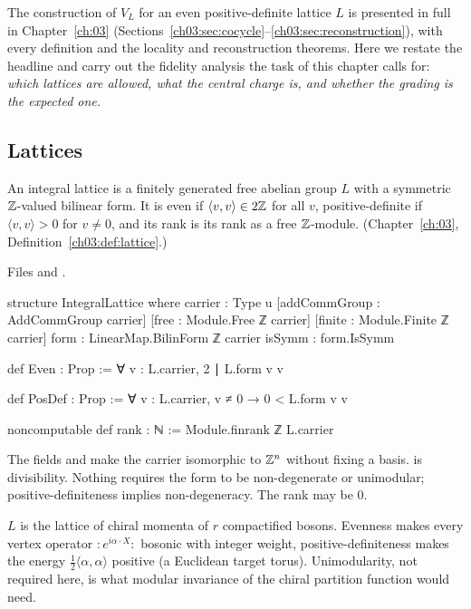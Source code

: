 The construction of $V_L$ for an even positive-definite lattice $L$ is presented in full in
Chapter~\ref{ch:03} (Sections~\ref{ch03:sec:cocycle}--\ref{ch03:sec:reconstruction}), with every
definition and the locality and reconstruction theorems. Here we restate the headline and carry out the
fidelity analysis the task of this chapter calls for: \emph{which lattices are allowed, what the central
charge is, and whether the grading is the expected one.}

\subsection{Lattices}

\begin{definition}\label{l05:def:lattice}
An integral lattice is a finitely generated free abelian group $L$ with a symmetric ${\mathbb{Z}}$-valued bilinear form.
It is even if $\langle v,v\rangle\in2{\mathbb{Z}}$ for all $v$, positive-definite if $\langle v,v\rangle>0$ for $v\ne0$, and
its rank is its rank as a free ${\mathbb{Z}}$-module. (Chapter~\ref{ch:03}, Definition~\ref{ch03:def:lattice}.)
\end{definition}

\noindent Files  and .
\begin{leancode}
structure IntegralLattice where
  carrier : Type u
  [addCommGroup : AddCommGroup carrier]
  [free : Module.Free ℤ carrier]
  [finite : Module.Finite ℤ carrier]
  form : LinearMap.BilinForm ℤ carrier
  isSymm : form.IsSymm

def Even : Prop := ∀ v : L.carrier, 2 ∣ L.form v v

def PosDef : Prop := ∀ v : L.carrier, v ≠ 0 → 0 < L.form v v

noncomputable def rank : ℕ := Module.finrank ℤ L.carrier
\end{leancode}

\begin{dictionary}
The fields  and  make the carrier isomorphic to ${\mathbb{Z}}^n$ without fixing a basis.
 is divisibility. Nothing requires the form to be non-degenerate or unimodular; positive-definiteness
implies non-degeneracy. The rank may be $0$.
\end{dictionary}

\begin{physics}
$L$ is the lattice of chiral momenta of $r$ compactified bosons. Evenness makes every vertex operator
${:}e^{i\alpha\cdot X}{:}$ bosonic with integer weight, positive-definiteness makes the energy
$\frac12\langle\alpha,\alpha\rangle$ positive (a Euclidean target torus). Unimodularity, not required here, is
what modular invariance of the chiral partition function would need.
\end{physics}

